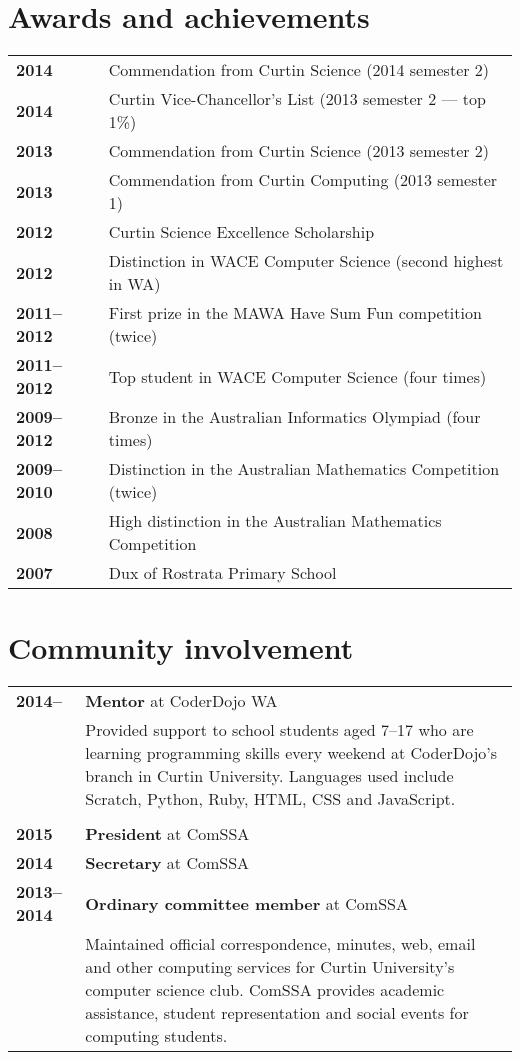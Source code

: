 \documentclass[a4paper,12pt]{article}
\begin{document}
\section*{Awards and achievements}

\begin{tabular}{p{3.5cm}p{12.5cm}}
	\textbf{2014} &
		Commendation from Curtin Science (2014 semester 2)\\
	\textbf{2014} &
		Curtin Vice-Chancellor's List (2013 semester 2 --- top 1\%)\\
	\textbf{2013} &
		Commendation from Curtin Science (2013 semester 2)\\
	\textbf{2013} &
		Commendation from Curtin Computing (2013 semester 1)\\
	\textbf{2012} &
		Curtin Science Excellence Scholarship\\
	\textbf{2012} &
		Distinction in WACE Computer Science (second highest in WA)\\
	\textbf{2011--2012} &
		First prize in the MAWA Have Sum Fun competition (twice)\\
	\textbf{2011--2012} &
		Top student in WACE Computer Science (four times)\\
	\textbf{2009--2012} &
		Bronze in the Australian Informatics Olympiad (four times)\\
	\textbf{2009--2010} &
		Distinction in the Australian Mathematics Competition (twice)\\
	\textbf{2008} &
		High distinction in the Australian Mathematics Competition\\
	\textbf{2007} &
		Dux of Rostrata Primary School
\end{tabular}

\section*{Community involvement}

\begin{tabular}{p{3.5cm}p{12.5cm}}
	\textbf{2014--} &
		\textbf{Mentor} at CoderDojo WA\\ &
		Provided support to school students aged 7--17 who are
		learning programming skills every weekend at CoderDojo's
		branch in Curtin University. Languages used include
		Scratch, Python, Ruby, HTML, CSS and JavaScript.\\\\
	\textbf{2015} &
		\textbf{President} at ComSSA\\
	\textbf{2014} &
		\textbf{Secretary} at ComSSA\\
	\textbf{2013--2014} &
		\textbf{Ordinary committee member} at ComSSA\\ &
		Maintained official correspondence, minutes, web, email and
		other computing services for Curtin University's computer
		science club. ComSSA provides academic assistance, student
		representation and social events for computing students.
\end{tabular}
\end{document}
